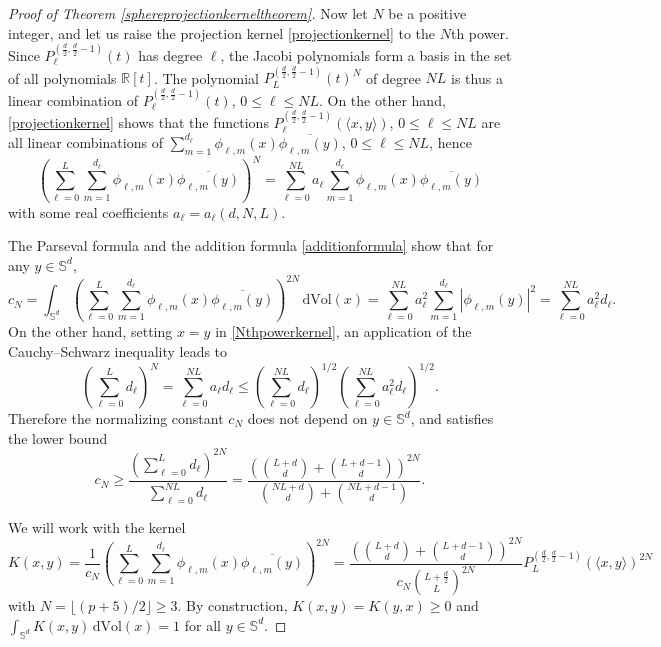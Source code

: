 \documentclass[11pt,a4paper]{article}
\theoremstyle{definition}
\begin{document}
\begin{proof}[Proof of Theorem \ref{sphereprojectionkerneltheorem}]
Now let $N$ be a positive integer, and let us raise the projection kernel \eqref{projectionkernel} to the $N$th power. Since $P_{\ell}^{(\frac{d}{2}, \frac{d}{2}-1)}(t)$ has degree $\ell$, the Jacobi polynomials form a basis in the set of all polynomials $\mathbb{R}[t]$. The polynomial $P_L^{(\frac{d}{2}, \frac{d}{2}-1)} (t)^N$ of degree $NL$ is thus a linear combination of $P_{\ell}^{(\frac{d}{2}, \frac{d}{2}-1)}(t)$, $0 \le \ell \le NL$. On the other hand, \eqref{projectionkernel} shows that the functions $P_{\ell}^{(\frac{d}{2}, \frac{d}{2}-1)}(\langle x,y \rangle)$, $0 \le \ell \le NL$ are all linear combinations of $\sum_{m=1}^{d_{\ell}} \phi_{\ell,m}(x) \overline{\phi_{\ell,m}(y)}$, $0 \le \ell \le NL$, hence
\begin{equation}\label{Nthpowerkernel}
\left( \sum_{\ell=0}^L \sum_{m=1}^{d_{\ell}} \phi_{\ell,m}(x) \overline{\phi_{\ell,m}(y)} \right)^N = \sum_{\ell=0}^{NL} a_{\ell} \sum_{m=1}^{d_{\ell}} \phi_{\ell,m}(x) \overline{\phi_{\ell,m}(y)}
\end{equation}
with some real coefficients $a_{\ell}=a_{\ell}(d,N,L)$.

The Parseval formula and the addition formula \eqref{additionformula} show that for any $y \in \mathbb{S}^d$,
\[ c_N = \int_{\mathbb{S}^d} \left( \sum_{\ell=0}^L \sum_{m=1}^{d_{\ell}} \phi_{\ell,m}(x) \overline{\phi_{\ell,m}(y)} \right)^{2N} \, \mathrm{d}\mathrm{Vol}(x) = \sum_{\ell=0}^{NL} a_{\ell}^2 \sum_{m=1}^{d_{\ell}} |\phi_{\ell, m}(y)|^2 = \sum_{\ell=0}^{NL} a_{\ell}^2 d_{\ell} . \]
On the other hand, setting $x=y$ in \eqref{Nthpowerkernel}, an application of the Cauchy--Schwarz inequality leads to
\[ \left( \sum_{\ell=0}^L d_{\ell} \right)^N = \sum_{\ell=0}^{NL} a_{\ell} d_{\ell} \le \left( \sum_{\ell=0}^{NL} d_{\ell} \right)^{1/2} \left( \sum_{\ell=0}^{NL} a_{\ell}^2 d_{\ell} \right)^{1/2} . \]
Therefore the normalizing constant $c_N$ does not depend on $y \in \mathbb{S}^d$, and satisfies the lower bound
\begin{equation}\label{cNlowerbound}
c_N \ge \frac{\left( \sum_{\ell=0}^L d_{\ell} \right)^{2N}}{\sum_{\ell=0}^{NL} d_{\ell}} = \frac{\left( \binom{L+d}{d} + \binom{L+d-1}{d} \right)^{2N}}{\binom{NL+d}{d} + \binom{NL+d-1}{d}} .
\end{equation}

We will work with the kernel
\[ K(x,y)  = \frac{1}{c_N} \left( \sum_{\ell=0}^L \sum_{m=1}^{d_{\ell}} \phi_{\ell,m}(x) \overline{\phi_{\ell,m}(y)} \right)^{2N} = \frac{\left( \binom{L+d}{d} + \binom{L+d-1}{d} \right)^{2N}}{c_N \binom{L+\frac{d}{2}}{L}^{2N}} P_L^{(\frac{d}{2}, \frac{d}{2}-1)} (\langle x,y \rangle)^{2N} \]
with $N=\lfloor (p+5)/2 \rfloor \ge 3$.
By construction, $K(x,y)=K(y,x) \ge 0$ and $\int_{\mathbb{S}^d} K(x,y) \, \mathrm{d}\mathrm{Vol}(x)=1$ for all $y \in \mathbb{S}^d$.


\end{proof}
\end{document}
